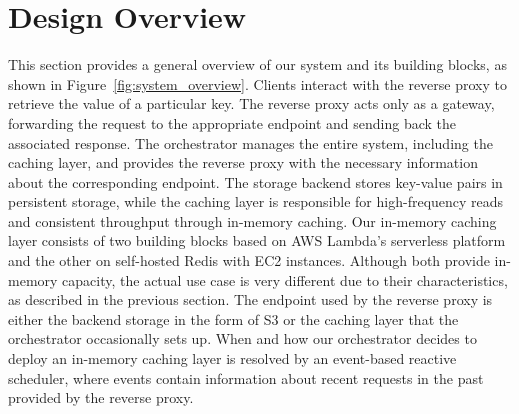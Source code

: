 

\section{Design Overview}
\label{sec:system_overview}
This section provides a general overview of our system and its building blocks, as shown in Figure~\ref{fig:system_overview}. Clients interact with the reverse proxy to retrieve the value of a particular key. The reverse proxy acts only as a gateway, forwarding the request to the appropriate endpoint and sending back the associated response. The orchestrator manages the entire system, including the caching layer, and provides the reverse proxy with the necessary information about the corresponding endpoint. The storage backend stores key-value pairs in persistent storage, while the caching layer is responsible for high-frequency reads and consistent throughput through in-memory caching. Our in-memory caching layer consists of two building blocks based on AWS Lambda's serverless platform and the other on self-hosted Redis with EC2 instances. Although both provide in-memory capacity, the actual use case is very different due to their characteristics, as described in the previous section. The endpoint used by the reverse proxy is either the backend storage in the form of S3 or the caching layer that the orchestrator occasionally sets up. When and how our orchestrator decides to deploy an in-memory caching layer is resolved by an event-based reactive scheduler, where events contain information about recent requests in the past provided by the reverse proxy.

